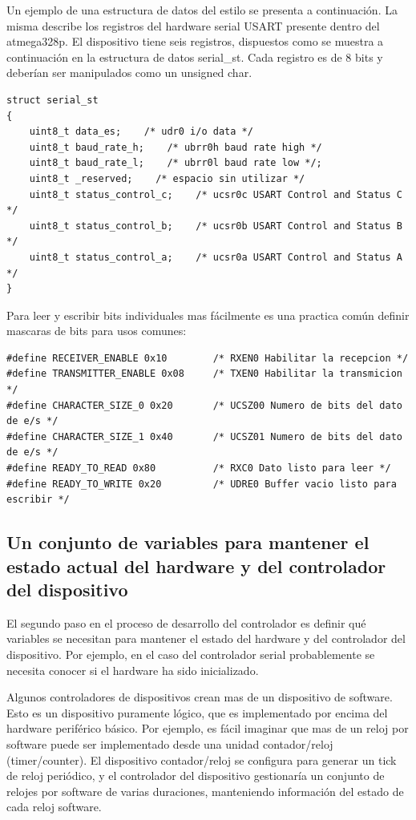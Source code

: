\documentclass[output=paper, 
colorlinks,
citecolor=brown,
newtxmath
]{langscibook}
\begin{document}
Un ejemplo de una estructura de datos del estilo se presenta a continuación.
La misma describe los registros del hardware serial USART presente dentro
del atmega328p. El dispositivo tiene seis registros, dispuestos como se muestra
a continuación en la estructura de datos serial\_st. Cada registro es de 
8 bits y deberían ser manipulados como un unsigned char.

\begin{verbatim}
struct serial_st
{
    uint8_t data_es;	/* udr0 i/o data */
    uint8_t baud_rate_h;    /* ubrr0h baud rate high */
    uint8_t baud_rate_l;    /* ubrr0l baud rate low */;
    uint8_t _reserved;    /* espacio sin utilizar */
    uint8_t status_control_c;    /* ucsr0c USART Control and Status C */
    uint8_t status_control_b;    /* ucsr0b USART Control and Status B */
    uint8_t status_control_a;    /* ucsr0a USART Control and Status A */
}
\end{verbatim}


Para leer y escribir bits individuales mas fácilmente es una practica común
definir mascaras de bits para usos comunes:

\begin{verbatim}
#define RECEIVER_ENABLE 0x10        /* RXEN0 Habilitar la recepcion */
#define TRANSMITTER_ENABLE 0x08     /* TXEN0 Habilitar la transmicion */
#define CHARACTER_SIZE_0 0x20       /* UCSZ00 Numero de bits del dato de e/s */
#define CHARACTER_SIZE_1 0x40       /* UCSZ01 Numero de bits del dato de e/s */
#define READY_TO_READ 0x80          /* RXC0 Dato listo para leer */
#define READY_TO_WRITE 0x20         /* UDRE0 Buffer vacio listo para escribir */
\end{verbatim}


\subsection{Un conjunto de variables para mantener el estado actual del hardware
y del controlador del dispositivo}

El segundo paso en el proceso de desarrollo del controlador es definir
qué variables se necesitan para mantener el estado del hardware y 
del controlador del dispositivo. Por ejemplo, en el caso del controlador 
serial probablemente se necesita conocer si el
hardware ha sido inicializado.

Algunos controladores de dispositivos crean mas de un dispositivo de software.
Esto es un dispositivo puramente lógico, que es implementado por encima
del hardware periférico básico. Por ejemplo, es fácil imaginar
que mas de un reloj por software puede ser implementado desde una
unidad contador/reloj (timer/counter). El dispositivo contador/reloj se configura
para generar un tick de reloj periódico, y el controlador del dispositivo
gestionaría un conjunto de relojes por software de varias duraciones,
manteniendo información del estado de cada reloj software.
\end{document}
